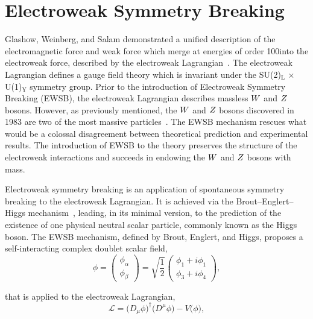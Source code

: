 \section{Electroweak Symmetry Breaking}
Glashow, Weinberg, and Salam demonstrated a unified description of the electromagnetic force 
and weak force which merge at energies of order 100\GeV into the electroweak force,
described by the electroweak Lagrangian~\cite{Glashow:1961tr,SM1,SM3}.
The electroweak Lagrangian defines a gauge field theory which is 
invariant under the SU(2)$_{\text{L}} \, \times \, $U(1)$_{\text{Y}}$ symmetry group. 
Prior to the introduction of Electroweak Symmetry Breaking (EWSB),
the electroweak Lagrangian describes massless $W$ and $Z$ bosons.
However, as previously mentioned, the $W$ and $Z$ bosons discovered in 1983
are two of the most massive particles~\cite{AUBERT1983275,1983398}. 
The EWSB mechanism rescues what would be a colossal disagreement between theoretical prediction
and experimental results. The introduction of EWSB to the theory preserves the structure of
the electroweak interactions and succeeds in endowing the $W$ and $Z$ bosons
with mass.

Electroweak symmetry breaking is an application of spontaneous symmetry breaking to
the electroweak Lagrangian. It is achieved via the Brout--Englert--Higgs
mechanism~\cite{Englert:1964et,Higgs:1964ia,Higgs:1964pj,Guralnik:1964eu,Higgs:1966ev,Kibble:1967sv},
leading, in its minimal version, to the prediction of the existence of one physical neutral scalar particle,
commonly known as the Higgs boson. The EWSB mechanism, defined by Brout, Englert, and Higgs,
proposes a self-interacting complex doublet scalar field,
\begin{equation}
\phi = \begin{pmatrix} \phi_{\alpha} \\ \phi_{\beta} \end{pmatrix} = 
    \sqrt{\frac{1}{2}} \begin{pmatrix}\phi_{1} + i\phi_{1} \\ \phi_{3} + i\phi_{4} \end{pmatrix},
\label{eqn:phi_doublet}
\end{equation}

that is applied to the electroweak Lagrangian, 
\begin{equation}
\mathcal{L} = \big(D_{\mu}\phi\big)^{\dagger} \big(D^{\mu}\phi\big) - V\big(\phi\big),
\end{equation}

